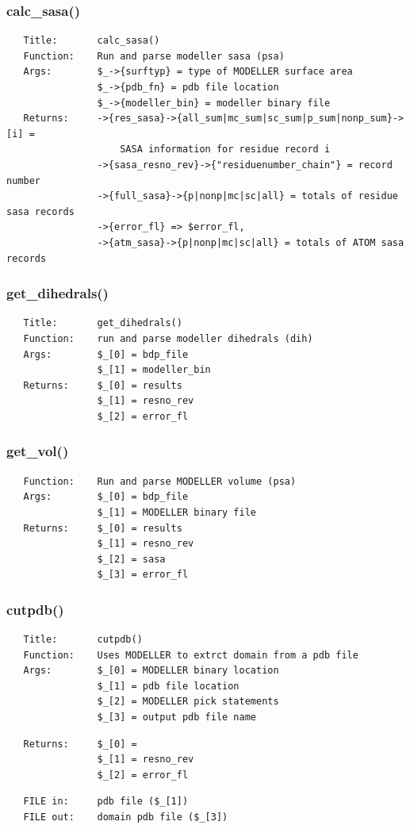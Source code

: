 \documentclass{article}
\begin{document}
\subsubsection*{calc\_sasa()\label{pibase::modeller_calc_sasa_}}
\begin{verbatim}
   Title:       calc_sasa()
   Function:    Run and parse modeller sasa (psa)
   Args:        $_->{surftyp} = type of MODELLER surface area
                $_->{pdb_fn} = pdb file location
                $_->{modeller_bin} = modeller binary file
   Returns:     ->{res_sasa}->{all_sum|mc_sum|sc_sum|p_sum|nonp_sum}->[i] =
                    SASA information for residue record i
                ->{sasa_resno_rev}->{"residuenumber_chain"} = record number
                ->{full_sasa}->{p|nonp|mc|sc|all} = totals of residue sasa records
                ->{error_fl} => $error_fl,
                ->{atm_sasa}->{p|nonp|mc|sc|all} = totals of ATOM sasa records
\end{verbatim}
\subsubsection*{get\_dihedrals()\label{pibase::modeller_get_dihedrals_}}
\begin{verbatim}
   Title:       get_dihedrals()
   Function:    run and parse modeller dihedrals (dih)
   Args:        $_[0] = bdp_file
                $_[1] = modeller_bin
   Returns:     $_[0] = results
                $_[1] = resno_rev
                $_[2] = error_fl
\end{verbatim}
\subsubsection*{get\_vol()\label{pibase::modeller_get_vol_}}
\begin{verbatim}
   Function:    Run and parse MODELLER volume (psa)
   Args:        $_[0] = bdp_file
                $_[1] = MODELLER binary file
   Returns:     $_[0] = results
                $_[1] = resno_rev
                $_[2] = sasa
                $_[3] = error_fl
\end{verbatim}
\subsubsection*{cutpdb()\label{pibase::modeller_cutpdb_}}
\begin{verbatim}
   Title:       cutpdb()
   Function:    Uses MODELLER to extrct domain from a pdb file
   Args:        $_[0] = MODELLER binary location
                $_[1] = pdb file location
                $_[2] = MODELLER pick statements
                $_[3] = output pdb file name
\end{verbatim}
\begin{verbatim}
   Returns:     $_[0] = 
                $_[1] = resno_rev
                $_[2] = error_fl
\end{verbatim}
\begin{verbatim}
   FILE in:     pdb file ($_[1])
   FILE out:    domain pdb file ($_[3])
\end{verbatim}
\end{document}
